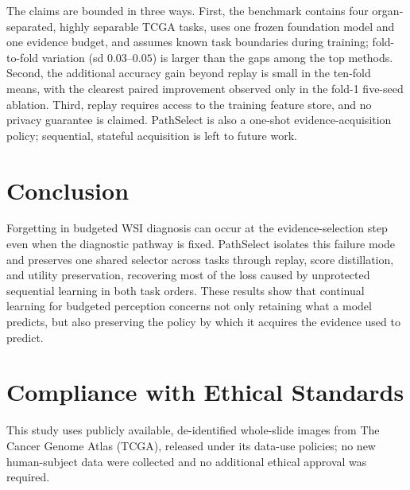 \documentclass{article}
\begin{document}
The claims are bounded in three ways. First, the benchmark contains four organ-separated, highly separable TCGA tasks, uses one frozen foundation model and one evidence budget, and assumes known task boundaries during training; fold-to-fold variation (sd $0.03$--$0.05$) is larger than the gaps among the top methods. Second, the additional accuracy gain beyond replay is small in the ten-fold means, with the clearest paired improvement observed only in the fold-1 five-seed ablation. Third, replay requires access to the training feature store, and no privacy guarantee is claimed. PathSelect is also a one-shot evidence-acquisition policy; sequential, stateful acquisition is left to future work.

\section{Conclusion}

Forgetting in budgeted WSI diagnosis can occur at the evidence-selection step even when the diagnostic pathway is fixed. PathSelect isolates this failure mode and preserves one shared selector across tasks through replay, score distillation, and utility preservation, recovering most of the loss caused by unprotected sequential learning in both task orders. These results show that continual learning for budgeted perception concerns not only retaining what a model predicts, but also preserving the policy by which it acquires the evidence used to predict.




\section*{Compliance with Ethical Standards}
This study uses publicly available, de-identified whole-slide images from The Cancer Genome Atlas (TCGA), released under its data-use policies; no new human-subject data were collected and no additional ethical approval was required.
\end{document}
